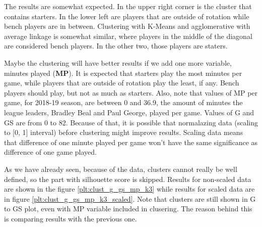 \documentclass[a4paper]{article}
\begin{document}
The results are somewhat expected. In the upper right corner is the cluster that contains starters. In the lower left are players that are outside of rotation while bench players are in between. Clustering  with K-Means and agglomerative with average linkage is somewhat similar, where players in the middle of the diagonal are considered bench players. In the other two, those players are staters.

Maybe the clustering will have better results if we add one more variable, minutes played (\textbf{MP}). It is expected that starters play the most minutes per game, while players that are outside of rotation play the least, if any. Bench players should play, but not as much as starters. Also, note that values of MP per game, for 2018-19 season, are between 0 and 36.9, the amount of minutes the league leaders, Bradley Beal and Paul George, played per game. Values of G and GS are from 0 to 82. Because of that, it is possible that normalazing data (scaling to [0, 1] interval) before clustering might improve results. Scaling data means that difference of one minute played per game won't have the same significance as difference of one game played.

As we have already seen, because of the data, clusters cannot really be well defined, so the part with silhouette score is skipped. Results for non-scaled data are shown in the figure \ref{plt:clust_g_gs_mp_k3} while results for scaled data are in figure \ref{plt:clust_g_gs_mp_k3_scaled}. Note that clusters are still shown in G to GS plot, even with MP variable included in clusering. The reason behind this is comparing results with the previous one.
\end{document}
